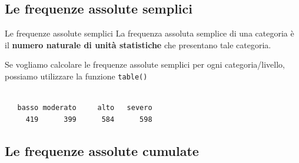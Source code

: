 \documentclass[
  ignorenonframetext,
  compress, aspectratio=149]{beamer}
\newenvironment{Shaded}{\begin{snugshade}}{\end{snugshade}}
\newcommand{\CommentTok}[1]{\textcolor[rgb]{0.56,0.35,0.01}{\textit{#1}}}
\newcommand{\FunctionTok}[1]{\textcolor[rgb]{0.13,0.29,0.53}{\textbf{#1}}}
\newcommand{\NormalTok}[1]{#1}
\newcommand{\SpecialCharTok}[1]{\textcolor[rgb]{0.81,0.36,0.00}{\textbf{#1}}}
\begin{document}
\subsection{Le frequenze assolute
semplici}\label{le-frequenze-assolute-semplici}

\begin{frame}[fragile]{Le frequenze assolute semplici}
La frequenza assoluta semplice di una categoria è il \textbf{numero
naturale di unità statistiche} che presentano tale categoria.

Se vogliamo calcolare le frequenze assolute semplici per ogni
categoria/livello, possiamo utilizzare la funzione \texttt{table()}

\begin{Shaded}
\end{Shaded}

\begin{verbatim}

   basso moderato     alto   severo 
     419      399      584      598 
\end{verbatim}
\end{frame}

\subsection{Le frequenze assolute
cumulate}\label{le-frequenze-assolute-cumulate}
\end{document}

